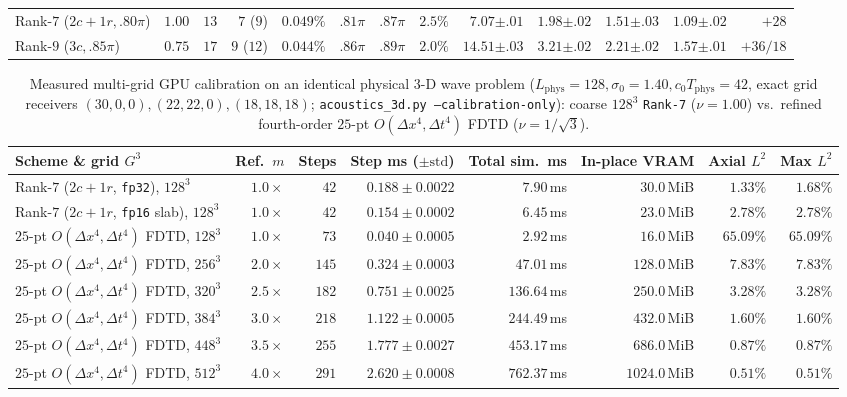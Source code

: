 \documentclass[11pt,a4paper]{article}
\theoremstyle{plain}
\theoremstyle{definition}
\begin{document}
\begin{table}[!htbp]
{\begin{tabular}{@{}llrrrrrrrrrrr@{}}
Rank-$7$ ($2c{+}1r, .80\pi$) & $1.00$ & $13$ & $7$ ($9$) & $0.049\%$ & $.81\pi$ & $.87\pi$ & $2.5\%$ & $7.07${\tiny$\pm.01$} & $1.98${\tiny$\pm.02$} & $1.51${\tiny$\pm.03$} & $1.09${\tiny$\pm.02$} & $+28$ \\
Rank-$9$ ($3c, .85\pi$) & $0.75$ & $17$ & $9$ ($12$) & $0.044\%$ & $.86\pi$ & $.89\pi$ & $2.0\%$ & $14.51${\tiny$\pm.03$} & $3.21${\tiny$\pm.02$} & $2.21${\tiny$\pm.02$} & $1.57${\tiny$\pm.01$} & $+36/18$ \\
\bottomrule
\end{tabular}}
\end{table}

\begin{table}[!htbp]
\centering
\caption{Measured multi-grid GPU calibration on an identical physical 3-D wave problem ($L_{\mathrm{phys}} = 128, \sigma_0 = 1.40, c_0 T_{\mathrm{phys}} = 42$, exact grid receivers $(30,0,0), (22,22,0), (18,18,18)$; \texttt{acoustics\_3d.py --calibration-only}): coarse $128^3$ \texttt{Rank-7} ($\nu = 1.00$) vs.\ refined fourth-order $25$-pt $O(\Delta x^4,\Delta t^4)$ FDTD ($\nu = 1/\sqrt{3}$).}\label{tab:fdtd_calib}
\smallskip
{\scriptsize\setlength{\tabcolsep}{2.4pt}
\begin{tabular}{@{}lrrrrrrr@{}}
\toprule
Scheme \& grid $G^3$ & Ref.\ $m$ & Steps & Step ms ($\pm\mathrm{std}$) & Total sim.\ ms & In-place VRAM & Axial $L^2$ & Max $L^2$ \\
\midrule
Rank-$7$ ($2c{+}1r$, \texttt{fp32}), $128^3$ & $1.0\times$ & $42$ & $0.188 \pm 0.0022$ & $\mathbf{7.90}$\,ms & $30.0$\,MiB & $1.33\%$ & $\mathbf{1.68\%}$ \\
Rank-$7$ ($2c{+}1r$, \texttt{fp16} slab), $128^3$ & $1.0\times$ & $42$ & $0.154 \pm 0.0002$ & $\mathbf{6.45}$\,ms & $23.0$\,MiB & $2.78\%$ & $2.78\%$ \\
\midrule
$25$-pt $O(\Delta x^4,\Delta t^4)$ FDTD, $128^3$ & $1.0\times$ & $73$ & $0.040 \pm 0.0005$ & $2.92$\,ms & $16.0$\,MiB & $65.09\%$ & $65.09\%$ \\
$25$-pt $O(\Delta x^4,\Delta t^4)$ FDTD, $256^3$ & $2.0\times$ & $145$ & $0.324 \pm 0.0003$ & $47.01$\,ms & $128.0$\,MiB & $7.83\%$ & $7.83\%$ \\
$25$-pt $O(\Delta x^4,\Delta t^4)$ FDTD, $320^3$ & $2.5\times$ & $182$ & $0.751 \pm 0.0025$ & $136.64$\,ms & $250.0$\,MiB & $3.28\%$ & $3.28\%$ \\
$25$-pt $O(\Delta x^4,\Delta t^4)$ FDTD, $384^3$ & $3.0\times$ & $218$ & $1.122 \pm 0.0005$ & $244.49$\,ms & $432.0$\,MiB & $1.60\%$ & $\mathbf{1.60\%}$ \\
$25$-pt $O(\Delta x^4,\Delta t^4)$ FDTD, $448^3$ & $3.5\times$ & $255$ & $1.777 \pm 0.0027$ & $453.17$\,ms & $686.0$\,MiB & $0.87\%$ & $0.87\%$ \\
$25$-pt $O(\Delta x^4,\Delta t^4)$ FDTD, $512^3$ & $4.0\times$ & $291$ & $2.620 \pm 0.0008$ & $762.37$\,ms & $1024.0$\,MiB & $0.51\%$ & $0.51\%$ \\
\bottomrule
\end{tabular}}
\end{table}
\end{document}

